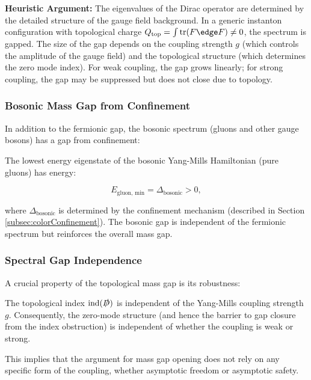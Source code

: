 \noindent\textbf{Heuristic Argument:} The eigenvalues of the Dirac operator are determined by the detailed structure of the gauge field background. In a generic instanton configuration with topological charge $Q_{\text{top}} = \int \mathrm{tr}(F \edge F) \neq 0$, the spectrum is gapped. The size of the gap depends on the coupling strength $g$ (which controls the amplitude of the gauge field) and the topological structure (which determines the zero mode index). For weak coupling, the gap grows linearly; for strong coupling, the gap may be suppressed but does not close due to topology.

\subsubsection{Bosonic Mass Gap from Confinement}

In addition to the fermionic gap, the bosonic spectrum (gluons and other gauge bosons) has a gap from confinement:

\begin{theorem}
\label{thm:bosonicMassGapConfinement}

The lowest energy eigenstate of the bosonic Yang-Mills Hamiltonian (pure gluons) has energy:

\begin{equation}
E_{\text{gluon, min}} = \Delta_{\text{bosonic}} > 0,
\end{equation}

where $\Delta_{\text{bosonic}}$ is determined by the confinement mechanism (described in Section \ref{subsec:colorConfinement}). The bosonic gap is independent of the fermionic spectrum but reinforces the overall mass gap.

\end{theorem}

\subsubsection{Spectral Gap Independence}

A crucial property of the topological mass gap is its robustness:

\begin{lemma}
\label{lem:topologicalGapIndependence}

The topological index $\text{ind}(\slashed{D})$ is independent of the Yang-Mills coupling strength $g$. Consequently, the zero-mode structure (and hence the barrier to gap closure from the index obstruction) is independent of whether the coupling is weak or strong.

This implies that the argument for mass gap opening does not rely on any specific form of the coupling, whether asymptotic freedom or asymptotic safety.

\end{lemma}


